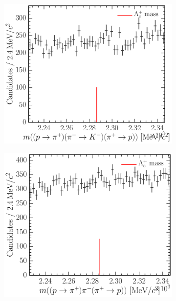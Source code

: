 \begin{figure}
\begin{subfigure}[b]{0.3\textwidth}
    \caption{\decay{\PLambdac}{\PKplus\Ppiminus\Pproton}}
    \label{fig:cpv:selection:background_study:ppipi_baryon:kpip}
  \end{subfigure}
  \begin{subfigure}[b]{0.3\textwidth}
    \includegraphics[width=\textwidth]{figures/cpv/selection/background_study/ppipi/LcToppipi_2012_MagDown_Lc_ppTopip_pimTokm_pipTopp}
    \caption{\decay{\PLambdac}{\Ppiplus\PKminus\Pproton}}
    \label{fig:cpv:selection:background_study:ppipi_baryon:pikp}
  \end{subfigure}
  \begin{subfigure}[b]{0.3\textwidth}
    \includegraphics[width=\textwidth]{figures/cpv/selection/background_study/ppipi/LcToppipi_2012_MagDown_Lc_ppTopip_pim_pipTopp}

\end{subfigure}
\end{figure}
